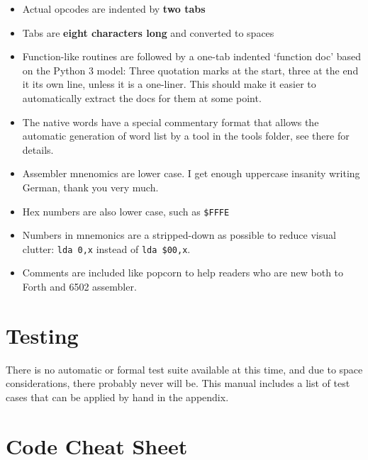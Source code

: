 \begin{itemize}

        \item Actual opcodes are indented by \textbf{two tabs}

        \item Tabs are \textbf{eight characters long} and converted to spaces

        \item Function-like routines are followed by a one-tab indented
                `function doc' based on the Python 3 model: Three
                quotation marks at the start, three at the end it its own line,
                unless it is a one-liner. This should make it easier to
                automatically extract the docs for them at some point.

        \item The native words have a special commentary format that allows the
                automatic generation of word list by a tool in the tools folder,
                see there for details.

        \item Assembler mnenomics are lower case. I get enough uppercase
                insanity writing German, thank you very much.

        \item Hex numbers are also lower case, such as \texttt{\$FFFE}

        \item Numbers in mnemonics are a stripped-down as possible to reduce
                visual clutter: \texttt{lda 0,x} instead of \texttt{lda \$00,x}.

        \item Comments are included like popcorn to help readers who are new
                both to Forth and 6502 assembler.

\end{itemize}


\section{Testing}

There is no automatic or formal test suite available at this time, and due to
space considerations, there probably never will be. This manual includes a list
of test cases that can be applied by hand in the appendix.


\section{Code Cheat Sheet}

